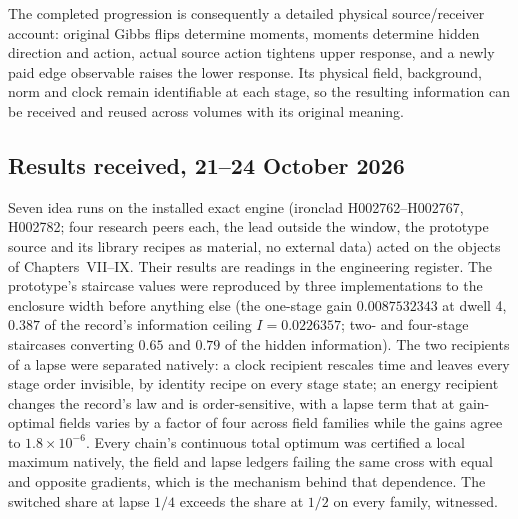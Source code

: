 The completed progression is consequently a detailed physical source/receiver account: original Gibbs flips determine moments, moments determine hidden direction and action, actual source action tightens upper response, and a newly paid edge observable raises the lower response. Its physical field, background, norm and clock remain identifiable at each stage, so the resulting information can be received and reused across volumes with its original meaning.

\subsection{Results received, 21--24 October 2026}
\label{v2c9:received}

Seven idea runs on the installed exact engine (ironclad H002762--H002767, H002782; four research peers each, the lead outside the window, the prototype source and its library recipes as material, no external data) acted on the objects of Chapters~VII--IX. Their results are readings in the engineering register.\cite{viimatterruns,viigaterun} The prototype's staircase values were reproduced by three implementations to the enclosure width before anything else (the one-stage gain $0.0087532343$ at dwell 4, $0.387$ of the record's information ceiling $I=0.0226357$; two- and four-stage staircases converting $0.65$ and $0.79$ of the hidden information). The two recipients of a lapse were separated natively: a clock recipient rescales time and leaves every stage order invisible, by identity recipe on every stage state; an energy recipient changes the record's law and is order-sensitive, with a lapse term that at gain-optimal fields varies by a factor of four across field families while the gains agree to $1.8\times10^{-6}$. Every chain's continuous total optimum was certified a local maximum natively, the field and lapse ledgers failing the same cross with equal and opposite gradients, which is the mechanism behind that dependence. The switched share at lapse $1/4$ exceeds the share at $1/2$ on every family, witnessed.

